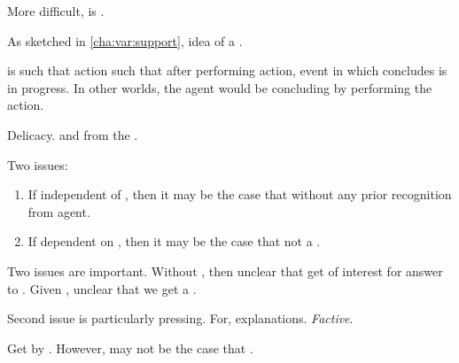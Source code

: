 \begin{note}
  More difficult, is \ros{}.

  As sketched in \autoref{cha:var:support}, idea of a \fc{}.
\end{note}

\begin{note}
  \fc{} is such that action such that after performing action, event in which concludes is in progress.
  In other worlds, the agent would be concluding by performing the action.

  Delicacy.
   and \ros{} from the \agpe{}.

  Two issues:

  \begin{enumerate}
  \item
    If independent of \agpe{}, then it may be the case that \fc{} without any prior recognition from agent.
  \item
    If dependent on \agpe{}, then it may be the case that not a \fc{}.
  \end{enumerate}

  Two issues are important.
  Without \agpe{}, then unclear that get \ros{} of interest for answer to \qWhyVnP{}.
  Given \agpe{}, unclear that we get a \ros{}.
\end{note}

\begin{note}
  Second issue is particularly pressing.
  For, explanations.
  \emph{Factive}.

  Get \ros{} by \fc{}.
  However, may not be the case that \fc{}.
\end{note}

